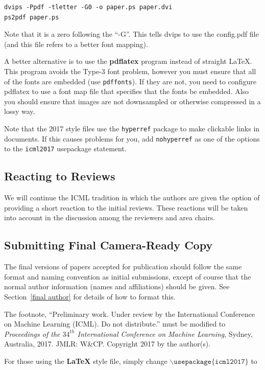 \documentclass{article}
\begin{document}
{\footnotesize
\begin{verbatim}
dvips -Ppdf -tletter -G0 -o paper.ps paper.dvi
ps2pdf paper.ps
\end{verbatim}}
Note that it is a zero following the ``-G''.  This tells dvips to use
the config.pdf file (and this file refers to a better font mapping).

A better alternative is to use the \textbf{pdflatex} program instead of
straight \LaTeX. This program avoids the Type-3 font problem, however you must
ensure that all of the fonts are embedded (use {\tt pdffonts}). If they are
not, you need to configure pdflatex to use a font map file that specifies that
the fonts be embedded. Also you should ensure that images are not downsampled
or otherwise compressed in a lossy way.

Note that the 2017 style files use the {\tt hyperref} package to
make clickable links in documents.  If this causes problems for you,
add {\tt nohyperref} as one of the options to the {\tt icml2017}
usepackage statement.

\subsection{Reacting to Reviews}

We will continue the ICML tradition in which the authors are given the
option of providing a short reaction to the initial reviews. These
reactions will be taken into account in the discussion among the
reviewers and area chairs.

\subsection{Submitting Final Camera-Ready Copy}

The final versions of papers accepted for publication should follow the
same format and naming convention as initial submissions, except of
course that the normal author information (names and affiliations)
should be given.  See Section~\ref{final author} for details of how to
format this.

The footnote, ``Preliminary work.  Under review by the International
Conference on Machine Learning (ICML).  Do not distribute.'' must be
modified to \textit{Proceedings of the
$\mathit{34}^{th}$ International Conference on Machine Learning},
Sydney, Australia, 2017.  JMLR: W\&CP. 
Copyright 2017 by the author(s).

For those using the \textbf{\LaTeX} style file, simply change
$\mathtt{\backslash usepackage\{icml2017\}}$ to 
\end{document}
